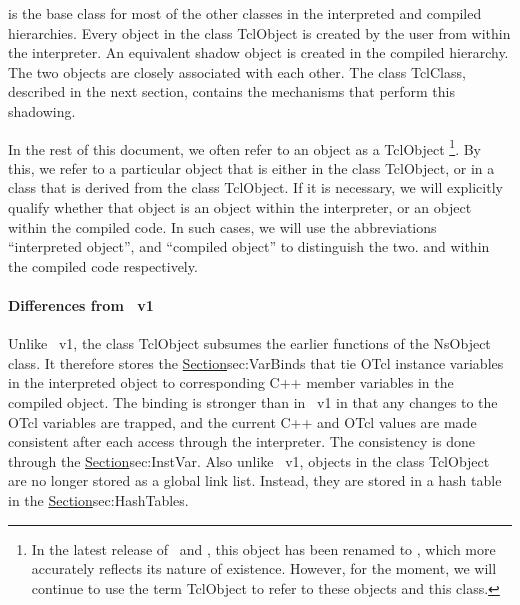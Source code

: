 is the base class for most of the other classes
in the interpreted and compiled hierarchies.
Every object in the class TclObject is created by the user
from within the interpreter.
An equivalent shadow object is created in the compiled hierarchy.
The two objects are closely associated with each other.
The class TclClass, described in the next section,
contains the mechanisms that perform this shadowing.

In the rest of this document, we often refer to an object as a TclObject%
\footnote{In the latest release of \ns\ and \nsTcl,
  this object has been renamed to ,
  which more accurately reflects its nature of existence.
  However, for the moment,
  we will continue to use the term TclObject
  to refer to these objects and this class.}.
By this, we refer to a particular object that is either in the class
TclObject, or in a class that is derived from the class TclObject.
If it is necessary, we will explicitly qualify whether that object is
an object within the interpreter, or an object within the compiled code.
In such cases,
we will use the abbreviations ``interpreted object'', and
``compiled object'' to distinguish the two.
and within the compiled code respectively.

\paragraph{Differences from \ns~v1}
Unlike \ns~v1, the class TclObject
subsumes the earlier functions of the NsObject class.
It therefore stores the
\href{interface variable bindings}{Section}{sec:VarBinds}
that tie OTcl instance variables in the interpreted object
to corresponding C++ member variables in the compiled object.
The binding is stronger than in \ns~v1 in that
any changes to the OTcl variables are trapped,
and the current C++ and OTcl values
are made consistent after each access through the interpreter.
The consistency is done through the
\href{class InstVar}{Section}{sec:InstVar}.
Also unlike \ns~v1, objects in the class TclObject
are no longer stored as a global link list.
Instead, they are stored in a hash table in the
\href{class Tcl}{Section}{sec:HashTables}.

